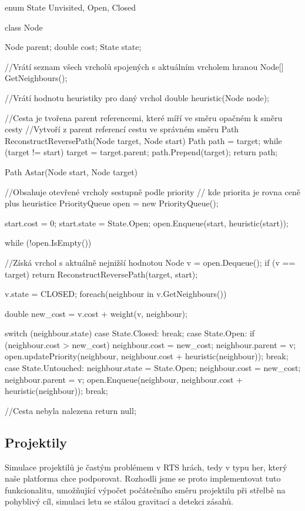 \begin{code}

enum State { Unvisited, Open, Closed}

class Node {
	Node parent;
	double cost;
	State state;
	
	//Vrátí seznam všech vrcholů spojených s aktuálním vrcholem hranou
	Node[] GetNeighbours();
}

//Vrátí hodnotu heuristiky pro daný vrchol
double heuristic(Node node);

//Cesta je tvořena parent referencemi, které míří ve směru opačném k směru cesty
//Vytvoří z parent referencí cestu ve správném směru
Path ReconstructReversePath(Node target, Node start) {
	Path path = {target};
	while (target != start) {
		target = target.parent;
		path.Prepend(target);
	}
	return path;
}	

Path Astar(Node start, Node target) {
	
//Obsahuje otevřené vrcholy sestupně podle priority
// kde priorita je rovna ceně plus heuristice
PriorityQueue open = new PriorityQueue();
	
start.cost = 0;
start.state = State.Open;
open.Enqueue(start, heuristic(start));

while (!open.IsEmpty()) {
		
	//Získá vrchol s aktuálně nejnižší hodnotou
	Node v = open.Dequeue();
	if (v == target) {
		return ReconstructReversePath(target, start);
	}
		
	v.state = CLOSED;
	foreach(neighbour in v.GetNeighbours()){
		
		double new_cost = v.cost + weight(v, neighbour);
		
		switch (neighbour.state) {
		case State.Closed:
			break;
		case State.Open:
			if (neighbour.cost > new_cost) {
				neighbour.cost = new_cost;
				neighbour.parent = v;
				open.updatePriority(neighbour,
				neighbour.cost + heuristic(neighbour));
			}
			break;
		case State.Untouched:
			neighbour.state = State.Open;
			neighbour.cost = new_cost;
			neighbour.parent = v;
			open.Enqueue(neighbour, neighbour.cost + heuristic(neighbour));
			break;				
		}	
	}
}

//Cesta nebyla nalezena
return null;
}
\end{code}



\subsection{Projektily}
Simulace projektilů je častým problémem v RTS hrách, tedy v typu her, který naše platforma chce podporovat. Rozhodli jsme se proto implementovat tuto funkcionalitu, umožňující výpočet počátečního směru projektilu při střelbě na pohyblivý cíl, simulaci letu se stálou gravitací a detekci zásahů. 

